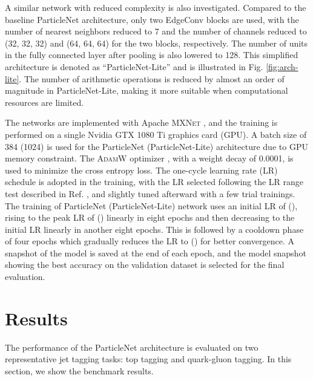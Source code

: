 \documentclass[aps,prd,longbibliography,reprint,amsmath,amssymb,amsfonts]{revtex4-1}
\begin{document}
A similar network with reduced complexity is also investigated. Compared to the baseline ParticleNet architecture, only two EdgeConv blocks are used, with the number of nearest neighbors  reduced to 7 and the number of channels  reduced to (32, 32, 32) and (64, 64, 64) for the two blocks, respectively. The number of units in the fully connected layer after pooling is also lowered to 128. This simplified architecture is denoted as ``ParticleNet-Lite'' and is illustrated in Fig. \ref{fig:arch-lite}. The number of arithmetic operations is reduced by almost an order of magnitude in ParticleNet-Lite, making it more suitable when computational resources are limited.

The networks are implemented with Apache \textsc{MXNet} \cite{DBLP:journals/corr/ChenLLLWWXXZZ15}, and the training is performed on a single Nvidia GTX 1080 Ti graphics card (GPU). A batch size of 384 (1024) is used for the ParticleNet (ParticleNet-Lite) architecture due to GPU memory constraint. The \textsc{AdamW} optimizer \cite{DBLP:journals/corr/abs-1711-05101}, with a weight decay of 0.0001, is used to minimize the cross entropy loss. The one-cycle learning rate (LR) schedule \cite{DBLP:journals/corr/abs-1803-09820} is adopted in the training, with the LR selected following the LR range test described in Ref. \cite{DBLP:journals/corr/abs-1803-09820}, and slightly tuned afterward with a few trial trainings. The training of ParticleNet (ParticleNet-Lite) network uses an initial LR of  (), rising to the peak LR of  () linearly in eight epochs and then decreasing to the initial LR linearly in another eight epochs. This is followed by a cooldown phase of four epochs which gradually reduces the LR to  () for better convergence. A snapshot of the model is saved at the end of each epoch, and the model snapshot showing the best accuracy on the validation dataset is selected for the final evaluation.
 \section{Results}
\label{sec:results}

The performance of the ParticleNet architecture is evaluated on two representative jet tagging tasks: top tagging and quark-gluon tagging. In this section, we show the benchmark results.
\end{document}
